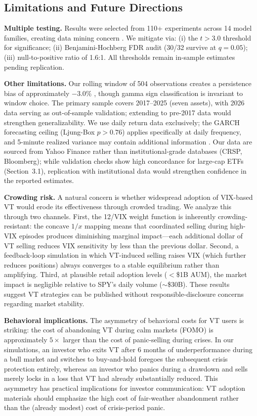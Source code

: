 \subsection{Limitations and Future Directions}

\textbf{Multiple testing.} Results were selected from 110+ experiments across 14 model families, creating data mining concern \citep{harvey2016}. We mitigate via: (i) the $t > 3.0$ threshold for significance; (ii) Benjamini-Hochberg FDR audit (30/32 survive at $q = 0.05$); (iii) null-to-positive ratio of 1.6:1. All thresholds remain in-sample estimates pending replication.

\textbf{Other limitations.} Our rolling window of 504 observations creates a persistence bias of approximately $-3.0\%$ \citep{hwang2006}, though gamma sign classification is invariant to window choice. The primary sample covers 2017--2025 (seven assets), with 2026 data serving as out-of-sample validation; extending to pre-2017 data would strengthen generalizability. We use daily return data exclusively; the GARCH forecasting ceiling (Ljung-Box $p > 0.76$) applies specifically at daily frequency, and 5-minute realized variance may contain additional information \citep{hansen2012}. Our data are sourced from Yahoo Finance rather than institutional-grade databases (CRSP, Bloomberg); while validation checks show high concordance for large-cap ETFs (Section~3.1), replication with institutional data would strengthen confidence in the reported estimates.

\textbf{Crowding risk.} A natural concern is whether widespread adoption of VIX-based VT would erode its effectiveness through crowded trading. We analyze this through two channels. First, the 12/VIX weight function is inherently crowding-resistant: the concave $1/x$ mapping means that coordinated selling during high-VIX episodes produces diminishing marginal impact---each additional dollar of VT selling reduces VIX sensitivity by less than the previous dollar. Second, a feedback-loop simulation in which VT-induced selling raises VIX (which further reduces positions) always converges to a stable equilibrium rather than amplifying. Third, at plausible retail adoption levels ($<$\$1B AUM), the market impact is negligible relative to SPY's daily volume ($\sim$\$30B). These results suggest VT strategies can be published without responsible-disclosure concerns regarding market stability.

\textbf{Behavioral implications.} The asymmetry of behavioral costs for VT users is striking: the cost of abandoning VT during calm markets (FOMO) is approximately $5\times$ larger than the cost of panic-selling during crises. In our simulations, an investor who exits VT after 6 months of underperformance during a bull market and switches to buy-and-hold foregoes the subsequent crisis protection entirely, whereas an investor who panics during a drawdown and sells merely locks in a loss that VT had already substantially reduced. This asymmetry has practical implications for investor communication: VT adoption materials should emphasize the high cost of fair-weather abandonment rather than the (already modest) cost of crisis-period panic.

